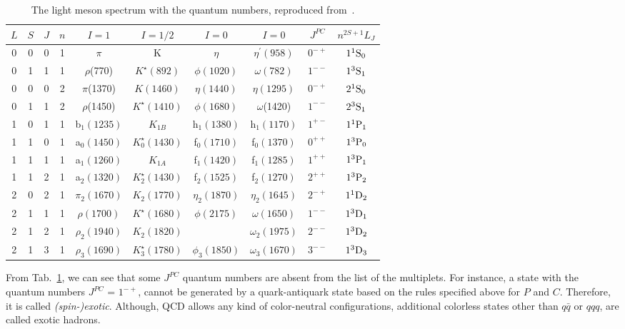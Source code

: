 \begin{table}[H]
    \centering
    \caption{The light meson spectrum with the quantum numbers, reproduced from~\cite{Tanabashi18}.}
    \label{tab.1.1}
    \begin{tabular}{cccccccccc}
        \hline
        $L$\qquad & $S$\qquad & $J$\qquad & $n$\qquad & $I=1$\qquad & $I=1/2$ \qquad & $I=0$\qquad & $I=0$\qquad & $J^{PC}$\qquad & $n^{2S+1}L_J$\qquad \\
        \hline
        0 & 0 & 0 & 1 & $\pi$ & K & $\eta$ & $\eta^{\prime}(958)$ & $0^{-+}$ & $\rm 1^1S_0$ \\
        0 & 1 & 1 & 1 & $\rho$(770) & $K^{\star}(892)$ & $\phi(1020)$ & $\omega(782)$ & $1^{--}$ & $\rm 1^3S_1$ \\
        \hline
        0 & 0 & 0 & 2 & $\pi$(1370) &  $K(1460)$  & $\eta (1440)$  & $\eta (1295)$ & $0^{-+}$ & $\rm 2^1S_0$\\
        0 & 1 & 1 & 2 & $\rho$(1450) & $K^{\star}(1410)$ & $\phi (1680)$ & $\omega$(1420) & $1^{--}$ & $\rm 2^3S_1$\\
        \hline        
        1 & 0 & 1 & 1 & b$_1(1235)$ & $K_{1B}$ & h$_1(1380)$ & h$_1(1170)$ \quad & $1^{+-}$ & $\rm 1^1P_1$\\
        1 & 1 & 0 & 1 & a$_0(1450)$ & $K_{0}^{\star}(1430)$ & f$_0(1710)$ & f$_0(1370)$ & $0^{++}$ & $\rm 1^3P_0$\\
        1 & 1 & 1 & 1 & a$_1(1260)$ & $K_{1A}$ & f$_1(1420)$ & f$_1(1285)$ & $1^{++}$ & $\rm 1^3P_1$\\
        1 & 1 & 2 & 1 & a$_2(1320)$ & $K_{2}^{\star}(1430)$ & f$_2(1525)$ & f$_2(1270)$ & $2^{++}$ & $\rm 1^3P_2$\\
        \hline
        2 & 0 & 2 & 1 & $\pi_2(1670)$ & $K_{2}(1770)$ & $\eta_2(1870)$ & $\eta_2(1645)$ & $2^{-+}$ & $\rm 1^1D_2$\\
        2 & 1 & 1 & 1 & $\rho(1700)$ & $K^{\star}(1680)$ & $\phi(2175)$ & $\omega(1650)$ & $1^{--}$ & $\rm 1^3D_1$\\
        2 & 1 & 2 & 1 & $\rho_2(1940)$ & $K_2(1820)$ &  & $\omega_2(1975)$ & $2^{--}$ & $\rm 1^3D_2$\\
        2 & 1 & 3 & 1 & $\rho_3(1690)$ & $K^{\star}_3(1780)$ & $\phi_3(1850)$ & $\omega_3(1670)$ & $3^{--}$ & $\rm 1^3D_3$\\
        \hline
    \end{tabular}
\end{table}

From Tab.~\ref{tab.1.1}, we can see that some $J^{PC}$ quantum numbers are absent from the list of the multiplets. For instance, a state with the quantum numbers $J^{PC}$ = $1^{-+}$, cannot be generated by a quark-antiquark state based on the rules specified above for $P$ and $C$. Therefore, it is called {\it (spin-)exotic}. Although, QCD allows any kind of color-neutral configurations, additional colorless states other than $q\bar{q}$ or $qqq$, are called exotic hadrons.

